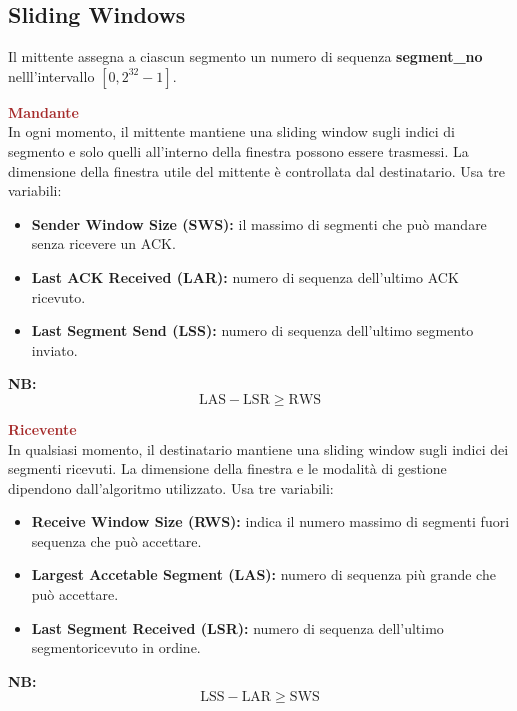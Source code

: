\newpage
\subsection{Sliding Windows}
Il mittente assegna a ciascun segmento un numero di sequenza \textbf{segment\_no} nelll'intervallo $[0, 2^{32} - 1]$.
\begin{center}
    \begin{minipage}{.45\linewidth}
        \begin{boxDef}
        \textbf{\textcolor{brown}{Mandante}} \\
        In ogni momento, il mittente mantiene una sliding window sugli indici di segmento e solo quelli all'interno della finestra possono essere trasmessi. La dimensione della finestra utile del mittente è controllata dal destinatario. Usa tre variabili:
            \begin{itemize}
                \item \textbf{Sender Window Size (SWS):} il massimo di segmenti che può mandare senza ricevere un ACK.
                \item \textbf{Last ACK Received (LAR):} numero di sequenza dell'ultimo ACK ricevuto.
                \item \textbf{Last Segment Send (LSS):} numero di sequenza dell'ultimo segmento inviato.
            \end{itemize}
        \textbf{NB:} \[\text{LAS} - \text{LSR} \ge \text{RWS}\]
        \end{boxDef}
    \end{minipage}
    \begin{minipage}{.45\linewidth}
        \begin{boxDef}
        \textbf{\textcolor{brown}{Ricevente}} \\
        In qualsiasi momento, il destinatario mantiene una sliding window sugli indici dei segmenti ricevuti. La dimensione della finestra e le modalità di gestione dipendono dall'algoritmo utilizzato. Usa tre variabili:
            \begin{itemize}
                \item \textbf{Receive Window Size (RWS):} indica il numero massimo di segmenti fuori sequenza che può accettare.
                \item \textbf{Largest Accetable Segment (LAS):} numero di sequenza più grande che può accettare. 
                \item \textbf{Last Segment Received (LSR):} numero di sequenza dell'ultimo segmentoricevuto in ordine.
            \end{itemize}
        \textbf{NB:} \[\text{LSS} - \text{LAR} \ge \text{SWS} \]
        \end{boxDef}
    \end{minipage}
\end{center}

